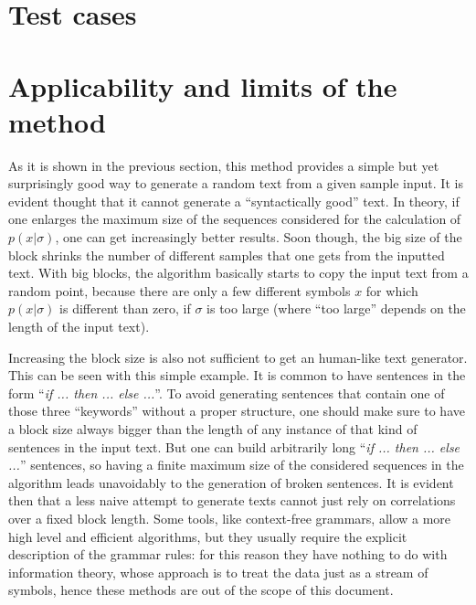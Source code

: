 \documentclass[conference]{IEEEtran}
\begin{document}
\section{Test cases}

\section{Applicability and limits of the method}

As it is shown in the previous section, this method provides a simple but yet surprisingly good way to generate a random text from a given sample input. It is evident thought that it cannot generate a ``syntactically good'' text. In theory, if one enlarges the maximum size of the sequences considered for the calculation of $p(x|\sigma)$, one can get increasingly better results. Soon though, the big size of the block shrinks the number of different samples that one gets from the inputted text. With big blocks, the algorithm basically starts to copy the input text from a random point, because there are only a few different symbols $x$ for which $p(x|\sigma)$ is different than zero, if $\sigma$ is too large (where ``too large'' depends on the length of the input text).

Increasing the block size is also not sufficient to get an human-like text generator. This can be seen with this simple example. It is common to have sentences in the form ``\emph{if ... then ... else ...}''. To avoid generating sentences that contain one of those three ``keywords'' without a proper structure, one should make sure to have a block size always bigger than the length of any instance of that kind of sentences in the input text. But one can build arbitrarily long ``\emph{if ... then ... else ...}'' sentences, so having a finite maximum size of the considered sequences in the algorithm leads unavoidably to the generation of broken sentences. It is evident then that a less naive attempt to generate texts cannot just rely on correlations over a fixed block length. Some tools, like context-free grammars, allow a more high level and efficient algorithms, but they usually require the explicit description of the grammar rules: for this reason they have nothing to do with information theory, whose approach is to treat the data just as a stream of symbols, hence these methods are out of the scope of this document.
\end{document}
